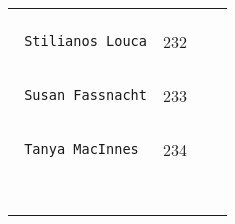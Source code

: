 \documentclass[]{article}
\begin{document}
\begin{longtable}[c]{@{}llll@{}}
\begin{minipage}[t]{0.15\columnwidth}
\end{minipage}
\\\noalign{\medskip}
\begin{minipage}[t]{0.39\columnwidth}\raggedright
\begin{verbatim}
 Stilianos Louca
\end{verbatim}
\end{minipage} & \begin{minipage}[t]{0.10\columnwidth}\raggedright
232
\end{minipage} & \begin{minipage}[t]{0.13\columnwidth}\raggedright
\end{minipage} & \begin{minipage}[t]{0.15\columnwidth}\raggedright
\end{minipage}
\\\noalign{\medskip}
\begin{minipage}[t]{0.39\columnwidth}\raggedright
\begin{verbatim}
 Susan Fassnacht
\end{verbatim}
\end{minipage} & \begin{minipage}[t]{0.10\columnwidth}\raggedright
233
\end{minipage} & \begin{minipage}[t]{0.13\columnwidth}\raggedright
\end{minipage} & \begin{minipage}[t]{0.15\columnwidth}\raggedright
\end{minipage}
\\\noalign{\medskip}
\begin{minipage}[t]{0.39\columnwidth}\raggedright
\begin{verbatim}
 Tanya MacInnes
\end{verbatim}
\end{minipage} & \begin{minipage}[t]{0.10\columnwidth}\raggedright
234
\end{minipage} & \begin{minipage}[t]{0.13\columnwidth}\raggedright
\end{minipage} & \begin{minipage}[t]{0.15\columnwidth}\raggedright
\end{minipage}
\\\noalign{\medskip}
\begin{minipage}[t]{0.39\columnwidth}\raggedright
\begin{verbatim}

\end{verbatim}
\end{minipage}
\end{longtable}
\end{document}
